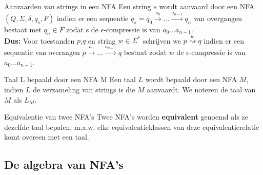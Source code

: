 \begin{theo}{Aanvaarden van strings in een NFA}
    Een string $s$ wordt aanvaard door een NFA $(Q,\Sigma, \delta, q_s, F)$ indien
    er een sequentie $q_s = q_0 \overset{a_0}{\to} \ldots \overset{a_{n-1}}{\to} q_n$
    van overgangen bestaat met $q_n \in F$ zodat s de $\epsilon$-compressie is van $a_0 \ldots a_{n-1}$. \\
    
    \noindent \textbf{Dus:} Voor toestanden $p$,$q$ en string $w \in \Sigma^*$ schrijven we $p \overset{w}{\rightsquigarrow} q$
    indien er een sequentie van overangen $ p \overset{a_0}{\to} \ldots \overset{a_{n-1}}{\to} q$ bestaat zodat $w$
    de $\epsilon$-compressie is van $a_0 \ldots a_{n-1}$.
\end{theo}

\begin{theo}{Taal L bepaald door een NFA M}
    Een taal $L$ wordt bepaald door een NFA $M$, indien $L$ de verzameling van strings is die $M$ aanvaardt.
    We noteren de taal van $M$ als $L_M$.
\end{theo}

\begin{theo}{Equivalentie van twee NFA's}
    Twee NFA's worden \textbf{equivalent} genoemd als ze dezelfde taal bepalen, m$.$a$.$w$.$ elke equivalentieklassen van deze equivalentierelatie komt overeen met een taal.
\end{theo}

\newpage

\subsection{De algebra van NFA's}

\vspace{0.5cm}

